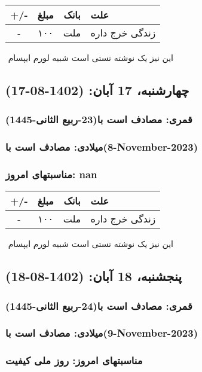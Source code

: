 \documentclass{article}
\newcommand{\rnote}[1]{\marginpar{\textcolor{color}{\StrSubstitute{\##1}{ }{\_}}}}
\newcommand{\myRow}[4]{
    #1 & #2 & #3 & #4 \\ \hline
}
\begin{document}
\begin{tabular}{ | c | c | c | p{5cm} |}
    \hline
    \myRow{ +/- }{مبلغ}{بانک}{علت}
    \myRow{-}{۱۰۰}{ملت}{زندگی خرج داره}
\end{tabular}
\newline
\newline

‌
\rnote{تست}
این نیز یک نوشته تستی است شبیه لورم ایپسام




\newpage
{}
\textcolor{color}{
\section{ چهارشنبه، 17 آبان: (1402-08-17) }
\subsubsection*{قمری: مصادف است با(23-ربیع الثانی-1445)} 
\subsubsection*{میلادی: مصادف است با(8-November-2023)}
\subsubsection*{مناسبتهای امروز: nan}
}


\begin{tabular}{ | c | c | c | p{5cm} |}
    \hline
    \myRow{ +/- }{مبلغ}{بانک}{علت}
    \myRow{-}{۱۰۰}{ملت}{زندگی خرج داره}
\end{tabular}
\newline
\newline

‌
\rnote{تست}
این نیز یک نوشته تستی است شبیه لورم ایپسام




\newpage
{}
\textcolor{color}{
\section{ پنجشنبه، 18 آبان: (1402-08-18) }
\subsubsection*{قمری: مصادف است با(24-ربیع الثانی-1445)} 
\subsubsection*{میلادی: مصادف است با(9-November-2023)}
\subsubsection*{مناسبتهای امروز: روز ملی کیفیت}
}
\end{document}
